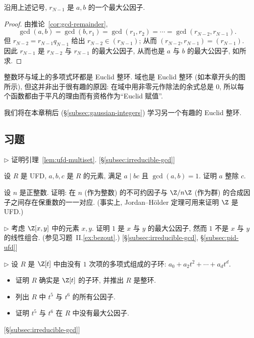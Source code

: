 \begin{proposition}\label{prop:euclid-gcd}
沿用上述记号, $r_{N-1}$ 是 $a,b$ 的一个最大公因子.
\end{proposition}

\begin{proof}
由推论~\ref{cor:gcd-remainder},
\[
\gcd(a,b)=\gcd(b,r_1)=\gcd(r_1,r_2)=\cdots=\gcd(r_{N-2},r_{N-1}).
\]
但 $r_{N-2}=r_{N-1}q_{N-1}$ 给出 $r_{N-2}\in (r_{N-1})$; 从而 $(r_{N-2},r_{N-1})=(r_{N-1})$. 因此 $r_{N-1}$ 是 $r_{N-2}$ 与 $r_{N-1}$ 的最大公因子, 从而也是 $a$ 与 $b$ 的最大公因子, 如所求.
\end{proof}

\noindent 整数环与域上的多项式环都是 Euclid 整环. 域也是 Euclid 整环 (如本章开头的图所示), 但这并非出于很有趣的原因: 在域中用非零元作除法的余式总是 $0$, 所以每个函数都由于平凡的理由而有资格作为``Euclid 赋值''.

\noindent 我们将在本章稍后 (§\ref{subsec:gaussian-integers}) 学习另一个有趣的 Euclid 整环.

\subsection*{习题}
{}

\begin{prob}
\label{ex:ufd-lemmas}
$\triangleright$ 证明引理~\ref{lem:ufd-multiset}. [§\ref{subsec:irreducible-gcd}]
\end{prob}

\begin{prob}
\label{ex:coprime-divides}
设 $R$ 是 UFD, $a,b,c$ 是 $R$ 的元素, 满足 $a\mid bc$ 且 $\gcd(a,b)=1$. 证明 $a$ 整除 $c$.
\end{prob}

\begin{prob}
\label{ex:zmodn-jordanholder}
设 $n$ 是正整数. 证明: 在 $n$ (作为整数) 的不可约因子与 $\Z/n\Z$ (作为群) 的合成因子之间存在保重数的一一对应. (事实上, Jordan--H\"older 定理可用来证明 $\Z$ 是 UFD.)
\end{prob}

\begin{prob}
\label{ex:xy-gcd}
$\triangleright$ 考虑 $\Z[x,y]$ 中的元素 $x,y$. 证明 $1$ 是 $x$ 与 $y$ 的最大公因子, 然而 $1$ 不是 $x$ 与 $y$ 的线性组合. (参见习题~II.\ref{ex:bezout}.) [§\ref{subsec:irreducible-gcd}, §\ref{subsec:pid-ufd}]
\end{prob}

\begin{prob}
\label{ex:subring-nodeg1}
$\triangleright$ 设 $R$ 是 $\Z[t]$ 中由没有 $1$ 次项的多项式组成的子环: $a_0+a_2t^2+\cdots+a_dt^d$.
\begin{itemize}
\item 证明 $R$ 确实是 $\Z[t]$ 的子环, 并推出 $R$ 是整环.
\item 列出 $R$ 中 $t^5$ 与 $t^6$ 的所有公因子.
\item 证明 $t^5$ 与 $t^6$ 在 $R$ 中没有最大公因子.
\end{itemize}
[§\ref{subsec:irreducible-gcd}]
\end{prob}

